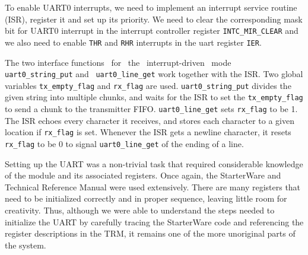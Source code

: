 \documentclass[12pt]{article}
\newcommand{\code}[1]{\colorbox{codegray}{\texttt{\footnotesize{#1}}}}
\begin{document}
To enable UART0 interrupts, we need to implement an interrupt service routine (ISR),
register it and set up its priority. We need to clear the corresponding mask bit
for UART0 interrupt in the interrupt controller register \code{INTC\_MIR\_CLEAR}
and we also need to enable \code{THR} and \code{RHR} interrupts in the
uart register \code{IER}.

The two interface functions~ for~ the~ interrupt-driven~ mode~ \code{uart0\_string\_put}
and~ \code{uart0\_line\_get} work together with the ISR. Two global variables
\code{tx\_empty\_flag} and \code{rx\_flag} are used. \code{uart0\_string\_put}
divides the given string into multiple chunks, and waits for the ISR to set the
\code{tx\_empty\_flag} to send a chunk to the transmitter FIFO. \code{uart0\_line\_get}
sets \code{rx\_flag} to be 1. The ISR echoes every character it receives, and stores each
character to a given location if \code{rx\_flag} is set. Whenever the ISR gets a newline
character, it resets \code{rx\_flag} to be 0 to signal \code{uart0\_line\_get} of the
ending of a line.

Setting up the UART was a non-trivial task that required considerable
knowledge of the module and its associated registers. Once again, the
StarterWare and Technical Reference Manual were used extensively. There
are many registers that need to be initialized correctly and in proper 
sequence, leaving little room for creativity. Thus, although we were
able to understand the steps needed to initialize the UART by carefully
tracing the StarterWare code and referencing the register descriptions in
the TRM, it remains one of the more unoriginal parts of the system.

\pagebreak

\nocite{*}

\footnotesize{{}}
\end{document}
